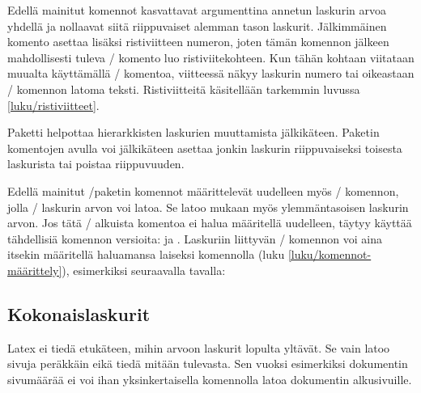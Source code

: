 \noindent
Edellä mainitut komennot kasvattavat argumenttina annetun laskurin arvoa
yhdellä ja nollaavat siitä riippuvaiset alemman tason laskurit.
Jälkimmäinen komento  asettaa lisäksi
ristiviitteen numeron, joten tämän komennon jälkeen mahdollisesti tuleva
\-/ komento luo ristiviitekohteen. Kun tähän kohtaan
viitataan muualta käyttämällä \-/ komentoa, viitteessä
näkyy laskurin numero tai oikeastaan \-/ komennon
latoma teksti. Ristiviitteitä käsitellään tarkemmin luvussa
\ref{luku/ristiviitteet}.

Paketti  helpottaa
hierarkkisten laskurien muuttamista jälkikäteen. Paketin komentojen
avulla voi jälkikäteen asettaa jonkin laskurin riippuvaiseksi toisesta
laskurista tai poistaa riippuvuuden.

\begin{koodilohkosis}
\end{koodilohkosis}

\noindent
Edellä mainitut \-/paketin komennot määrittelevät
uudelleen myös \-/ komennon, jolla \-/
laskurin arvon voi latoa. Se latoo mukaan myös ylemmäntasoisen laskurin
arvon. Jos tätä \-/ alkuista komentoa ei halua määritellä
uudelleen, täytyy käyttää tähdellisiä komennon versioita:
 ja . Laskuriin
liittyvän \-/ komennon voi aina itsekin määritellä
haluamansa laiseksi komennolla  (luku
\ref{luku/komennot-määrittely}), esimerkiksi seuraavalla tavalla:

\begin{koodilohkosis}
\renewcommand{\theoma}{\arabic{page}/\alph{oma}}
\end{koodilohkosis}

\subsection{Kokonaislaskurit}

Latex ei tiedä etukäteen, mihin arvoon laskurit lopulta yltävät. Se vain
latoo sivuja peräkkäin eikä tiedä mitään tulevasta. Sen vuoksi
esimerkiksi dokumentin sivumäärää ei voi ihan yksinkertaisella
komennolla latoa dokumentin alkusivuille.

